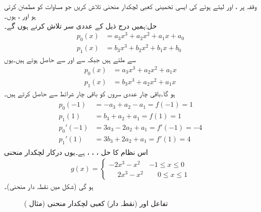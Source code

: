 \quad {}\\
وقفہ  پر ،  اور  لیتے ہوئے   کی ایسی تخمینی کعبی لچکدار منحنی تلاش کریں جو مساوات  کو مطمئن کرتی ہو اور ،  ہوں۔\\
حل:\quad ہمیں درج ذیل کے عددی سر تلاش کرنے ہوں گے۔
\begin{align*}
p_0(x)&=a_3x^3+a_2x^2+a_1x+a_0\\
p_1(x)&=b_3x^3+b_2x^2+b_1x+b_0
\end{align*}
 سے  ملتے ہیں جبکہ  سے  اور  سے  حاصل ہوتے ہیں۔یوں
\begin{align*}
p_0(x)&=a_3x^3+a_2x^2+a_1x\\
p_1(x)&=b_3x^3+a_2x^2+a_1x
\end{align*}
ہو گا۔باقی چار عددی سروں  کو باقی چار شرائط سے حاصل کرتے ہیں۔
\begin{gather}
\begin{aligned}\label{مساوات_اعدادی_دو_درجی_تفرق_ت}
p_0(-1)&=-a_3+a_2-a_1=f(-1)=1\\
p_1(1)&=b_3+a_2+a_1=f(1)=1\\
p_0'(-1)&=3a_3-2a_2+a_1=f'(-1)=-4\\
p_1'(1)&=3b_3+2a_2+a_1=f'(1)=4
\end{aligned}
\end{gather}
اس نظام کا حل ، ، ،  ہے۔یوں درکار لچکدار منحنی
\begin{align}\label{مساوات_اعدادی_دو_درجی_تفرق_ٹ}
g(x)=
\begin{cases}
-2x^3-x^2&-1\le x\le 0\\
\phantom{-}2x^3-x^2&\phantom{-}0\le x\le 1
\end{cases}
\end{align}
ہو گی (شکل  میں نقطہ دار منحنی)۔ 
\begin{figure}
\centering
{}
\caption{تفاعل  اور (نقطہ دار) کعبی لچکدار منحنی  (مثال )}
\label{شکل_مثال_اعدادی_کعبی_لچکدار_منحنی_الف}
\end{figure}
